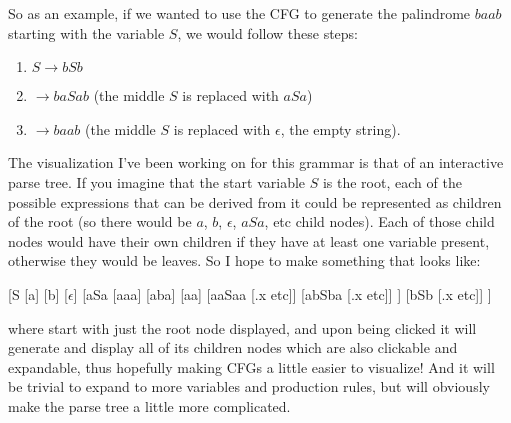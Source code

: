 \documentclass[•]{article}
\begin{document}
So as an example, if we wanted to use the CFG to generate the palindrome $baab$ starting with the variable $S$, we would follow these steps:
\begin{enumerate}
	\item $S \rightarrow bSb$
	\item $ \rightarrow baSab$ (the middle $S$ is replaced with $aSa$)
	\item $ \rightarrow baab$ (the middle $S$ is replaced with $\epsilon$, the empty string).
\end{enumerate}

The visualization I've been working on for this grammar is that of an interactive parse tree. If you imagine that the start variable $S$ is the root, each of the possible expressions that can be derived from it could be represented as children of the root (so there would be $a$, $b$, $\epsilon$, $aSa$, etc child nodes). Each of those child nodes would have their own children if they have at least one variable present, otherwise they would be leaves. So I hope to make something that looks like:

\begin{center}
[S
[a] [b] [$\epsilon$]
[aSa 
	[aaa] [aba] [aa] [aaSaa [.x etc]] [abSba [.x etc]]
	] [bSb [.x etc]]
]
\end{center}


where start with just the root node displayed, and upon being clicked it will generate and display all of its children nodes which are also clickable and expandable, thus hopefully making CFGs a little easier to visualize! And it will be trivial to expand to more variables and production rules, but will obviously make the parse tree a little more complicated.
\end{document}
